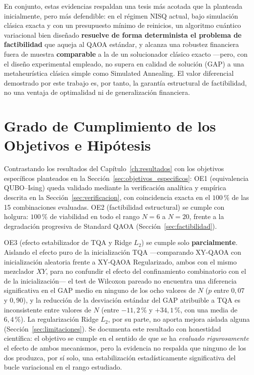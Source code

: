 En conjunto, estas evidencias respaldan una tesis más acotada que la planteada inicialmente, pero más defendible:
en el régimen NISQ actual, bajo simulación clásica exacta y con un presupuesto mínimo de reinicios, un algoritmo
cuántico variacional bien diseñado \textbf{resuelve de forma determinista el problema de factibilidad} que
aqueja al QAOA estándar, y alcanza una robustez financiera fuera de muestra \textbf{comparable} a la de un
solucionador clásico exacto —pero, con el diseño experimental empleado, no supera en calidad de solución (GAP)
a una metaheurística clásica simple como Simulated Annealing. El valor diferencial demostrado por este trabajo
es, por tanto, la garantía estructural de factibilidad, no una ventaja de optimalidad ni de generalización
financiera.

\section{Grado de Cumplimiento de los Objetivos e Hipótesis}
\label{sec:cumplimiento_objetivos}

Contrastando los resultados del Capítulo~\ref{ch:resultados} con los objetivos específicos planteados en la
Sección~\ref{sec:objetivos_especificos}: OE1 (equivalencia QUBO--Ising) queda validado mediante la verificación
analítica y empírica descrita en la Sección~\ref{sec:verificacion}, con coincidencia exacta en el $100\,\%$ de
las 15 combinaciones evaluadas. OE2 (factibilidad estructural) se cumple con holgura: $100\,\%$ de viabilidad en
todo el rango $N=6$ a $N=20$, frente a la degradación progresiva de Standard QAOA (Sección~\ref{sec:factibilidad}).

OE3 (efecto estabilizador de TQA y Ridge $L_2$) se cumple solo \textbf{parcialmente}. Aislando el efecto puro de
la inicialización TQA —comparando XY-QAOA con inicialización aleatoria frente a XY-QAOA Regularizado, ambos con
el mismo mezclador $XY$, para no confundir el efecto del confinamiento combinatorio con el de la
inicialización— el test de Wilcoxon pareado no encuentra una diferencia significativa en el GAP medio en ninguno
de los ocho valores de $N$ ($p$ entre $0{,}07$ y $0{,}90$), y la reducción de la desviación estándar del GAP
atribuible a TQA es inconsistente entre valores de $N$ (entre $-11{,}2\,\%$ y $+34{,}1\,\%$, con una media de
$6{,}4\,\%$). La regularización Ridge $L_2$, por su parte, no aporta mejora aislada alguna (Sección~\ref{sec:limitaciones}).
Se documenta este resultado con honestidad científica: el objetivo se cumple en el sentido de que se ha
\emph{evaluado rigurosamente} el efecto de ambos mecanismos, pero la evidencia no respalda que ninguno de los
dos produzca, por sí solo, una estabilización estadísticamente significativa del bucle variacional en el rango
estudiado.

